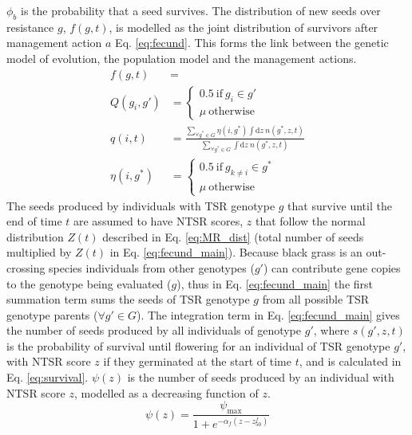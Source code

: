 \documentclass[12pt, a4paper]{article}
\begin{document}
 $\phi_b$ is the probability that a seed survives. The distribution of new seeds over resistance $g$,  $f(g, t)$, is modelled as the joint distribution of survivors after management action $a$ Eq. \ref{eq:fecund}. This forms the link between the genetic model of evolution, the population model and the management actions.      
\begin{subequations}
\label{eq:fecund}
\begin{align}
	\displaystyle
	\label{eq:fecund_main}
	f(g, t) &= \\
	\label{eq:fecund_maternal}
	Q(g_i, g') &= 
	\begin{cases}
		0.5 ~\text{if}~ g_i \in g' \\
		\mu ~\text{otherwise}
	\end{cases}\\
	\label{eq:fecund_pollen}
	q(i, t) &= \frac{\displaystyle\sum_{\forall g^* \in G} \eta(i, g^*) \int \text{d}z~n(g^*, z, t)}{\displaystyle \sum_{\forall g^* \in G} \int \text{d}z~n(g^*, z, t)}\\
	\label{eq:pollen_freq}
	\eta(i, g^*) &= 
	\begin{cases}
	0.5~\text{if}~g_{k \neq i} \in g^* \\
	\mu ~\text{otherwise}
	\end{cases}    
\end{align} 
\end{subequations}
The seeds produced by individuals with TSR genotype $g$ that survive until the end of time $t$ are assumed to have NTSR scores, $z$ that follow the normal distribution $Z(t)$ described in Eq. \ref{eq:MR_dist} (total number of seeds multiplied by $Z(t)$ in Eq. \ref{eq:fecund_main}). Because black grass is an out-crossing species individuals from other genotypes ($g'$) can contribute gene copies to the genotype being evaluated ($g$), thus in Eq. \ref{eq:fecund_main} the first summation term sums the seeds of TSR genotype $g$ from all possible TSR genotype parents ($\forall g' \in G$). The integration term in Eq. \ref{eq:fecund_main} gives the number of seeds produced by all individuals of genotype $g'$, where $s(g', z, t)$ is the probability of survival until flowering for an individual of TSR genotype $g'$, with NTSR score $z$ if they germinated at the start of time $t$, and is calculated in Eq. \ref{eq:survival}. $\psi(z)$ is the number of seeds produced by an individual with NTSR score $z$, modelled as a decreasing function of $z$.
\begin{equation}\label{eq:fecund_seed_num}
	\psi(z) = \frac{\psi_\text{max}}{1 + e^{-\alpha_f(z - z_{50}^f)}}
\end{equation}         
\end{document}

